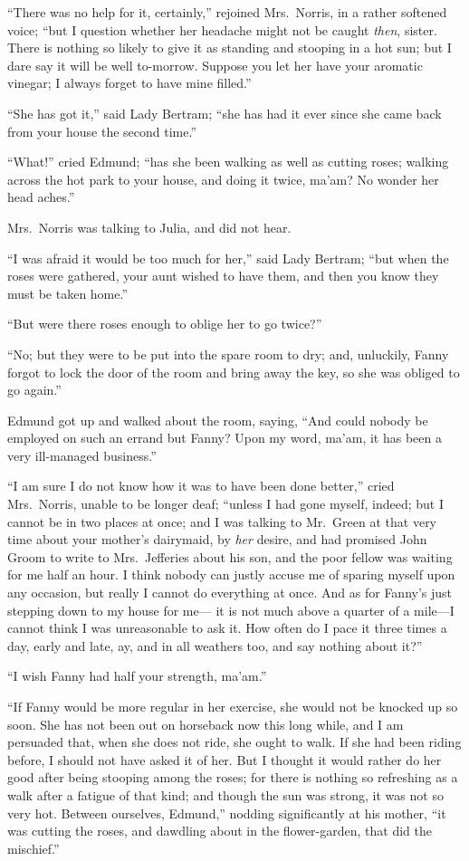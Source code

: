 ``There was no help for it, certainly,'' rejoined Mrs.\ Norris,
in a rather softened voice; ``but I question whether her
headache might not be caught \emph{then}, sister.  There is
nothing so likely to give it as standing and stooping
in a hot sun; but I dare say it will be well to-morrow.
Suppose you let her have your aromatic vinegar; I always
forget to have mine filled.''

``She has got it,'' said Lady Bertram; ``she has had it ever
since she came back from your house the second time.''

``What!'' cried Edmund; ``has she been walking as well as
cutting roses; walking across the hot park to your house,
and doing it twice, ma'am?  No wonder her head aches.''

Mrs.\ Norris was talking to Julia, and did not hear.

``I was afraid it would be too much for her,'' said Lady Bertram;
``but when the roses were gathered, your aunt wished
to have them, and then you know they must be taken home.''

``But were there roses enough to oblige her to go twice?''

``No; but they were to be put into the spare room to dry;
and, unluckily, Fanny forgot to lock the door of the room
and bring away the key, so she was obliged to go again.''

Edmund got up and walked about the room, saying, ``And could
nobody be employed on such an errand but Fanny?  Upon my word,
ma'am, it has been a very ill-managed business.''

``I am sure I do not know how it was to have been done better,''
cried Mrs.\ Norris, unable to be longer deaf; ``unless I had
gone myself, indeed; but I cannot be in two places at once;
and I was talking to Mr.\ Green at that very time about
your mother's dairymaid, by \emph{her} desire, and had promised
John Groom to write to Mrs.\ Jefferies about his son,
and the poor fellow was waiting for me half an hour.
I think nobody can justly accuse me of sparing myself upon
any occasion, but really I cannot do everything at once.
And as for Fanny's just stepping down to my house for me---%
it is not much above a quarter of a mile---I cannot think I
was unreasonable to ask it.  How often do I pace it three
times a day, early and late, ay, and in all weathers too,
and say nothing about it?''

``I wish Fanny had half your strength, ma'am.''

``If Fanny would be more regular in her exercise, she would
not be knocked up so soon.  She has not been out on
horseback now this long while, and I am persuaded that,
when she does not ride, she ought to walk.  If she had
been riding before, I should not have asked it of her.
But I thought it would rather do her good after being
stooping among the roses; for there is nothing so
refreshing as a walk after a fatigue of that kind;
and though the sun was strong, it was not so very hot.
Between ourselves, Edmund,'' nodding significantly at
his mother, ``it was cutting the roses, and dawdling
about in the flower-garden, that did the mischief.''


